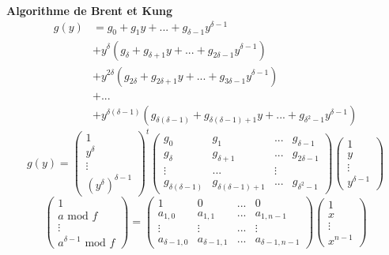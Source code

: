 \documentclass[10pt,a4paper]{beamer}
\begin{document}
\begin{frame}
    \textbf{Algorithme de Brent et Kung} 
    \begin{align*}
        g(y) &= g_0 + g_1y + ... + g_{\delta-1}y^{\delta-1} \\
            &+ y^\delta(g_\delta + g_{\delta+1}y + ... + g_{2\delta-1}y^{\delta-1}) \\
                                          &+ y^{2\delta}(g_{2\delta} + g_{2\delta+1}y + ... + g_{3\delta-1}y^{\delta-1}) \\
                                          &+ ... \\
                                          &+ y^{\delta(\delta-1)}(g_{\delta(\delta-1)} + g_{\delta(\delta-1)+1}y + ... + g_{\delta^2-1}y^{\delta-1}) 
    \end{align*}
    \[
    g(y) = 
    \begin{pmatrix}
        1 \\
        y^\delta \\
        \vdots \\
        (y^\delta)^{\delta-1} 
    \end{pmatrix}^t
    \begin{pmatrix}
        g_0 & g_1 & ... & g_{\delta-1} \\
        g_{\delta} & g_{\delta+1} & ... & g_{2\delta-1} \\
        \vdots & ... & \vdots \\
        g_{\delta(\delta-1)} & g_{\delta(\delta-1)+1} & ... & g_{\delta^2-1}
    \end{pmatrix}
    \begin{pmatrix}
        1 \\
        y \\
        \vdots \\
        y^{\delta-1}
    \end{pmatrix}
    \]
    \[
    \begin{pmatrix}
        1 \\
        a \text{ mod }f\\
        \vdots \\
        a^{\delta-1} \text{ mod }f
    \end{pmatrix}
    =
    \begin{pmatrix}
        1 & 0 & ... & 0 \\
        a_{1,0} & a_{1,1} & ... & a_{1,n-1} \\
        \vdots & \vdots & ... & \vdots \\
        a_{\delta-1,0} & a_{\delta-1,1} & ... & a_{\delta-1,n-1}
    \end{pmatrix}
    \begin{pmatrix}
        1 \\
        x \\
        \vdots \\
        x^{n-1}
    \end{pmatrix}
    \]
\end{frame}
\end{document}
